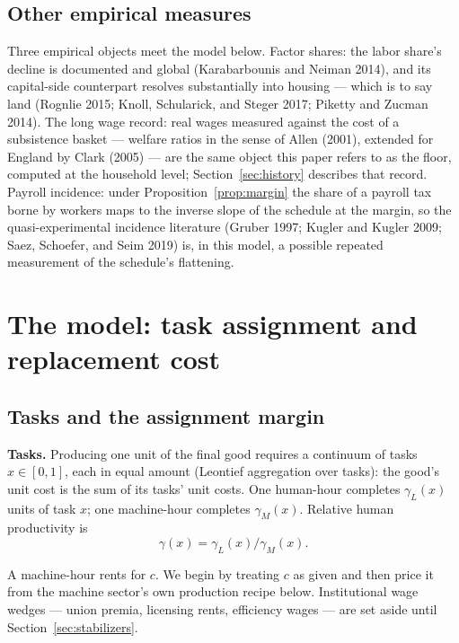 \documentclass[12pt]{article}
\theoremstyle{plain}
\begin{document}
\subsection{Other empirical measures}\label{sec:data}

Three empirical objects meet the model below. Factor shares: the labor share's decline is documented and global (Karabarbounis and Neiman 2014), and its capital-side counterpart resolves substantially into housing --- which is to say land (Rognlie 2015; Knoll, Schularick, and Steger 2017; Piketty and Zucman 2014). The long wage record: real wages measured against the cost of a subsistence basket --- welfare ratios in the sense of Allen (2001), extended for England by Clark (2005) --- are the same object this paper refers to as the floor, computed at the household level; Section~\ref{sec:history} describes that record. Payroll incidence: under Proposition~\ref{prop:margin} the share of a payroll tax borne by workers maps to the inverse slope of the schedule at the margin, so the quasi-experimental incidence literature (Gruber 1997; Kugler and Kugler 2009; Saez, Schoefer, and Seim 2019) is, in this model, a possible repeated measurement of the schedule's flattening.

\section{The model: task assignment and replacement cost}\label{sec:model}

\subsection{Tasks and the assignment margin}

\textbf{Tasks.} Producing one unit of the final good requires a continuum of tasks
$x \in [0,1]$, each in equal amount (Leontief aggregation over tasks): the good's
unit cost is the sum of its tasks' unit costs. One human-hour completes
$\gamma_L(x)$ units of task $x$; one machine-hour completes $\gamma_M(x)$.
Relative human productivity is
\begin{equation}\label{eq:gamma}
\gamma(x) = \gamma_L(x) / \gamma_M(x).
\end{equation}

A machine-hour rents for $c$. We begin by treating $c$ as given and then price it
from the machine sector's own production recipe below. Institutional wage wedges
--- union premia, licensing rents, efficiency wages --- are set aside until
Section~\ref{sec:stabilizers}.
\end{document}
